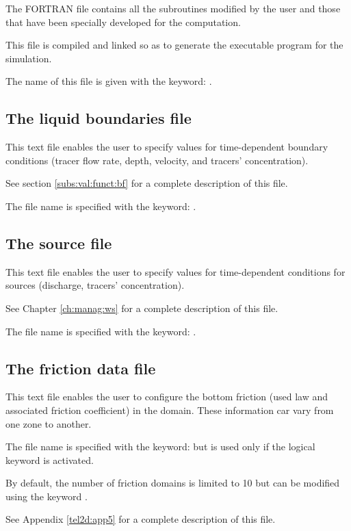  The FORTRAN file contains all the  subroutines modified by the user and those that have been specially developed for the computation.

 This file is compiled and linked so as to generate the executable program for the simulation.

 The name of this file is given with the keyword: .


\subsection{ The liquid boundaries file}

 This text file enables the user to specify values for time-dependent boundary conditions (tracer flow rate, depth, velocity, and tracers' concentration).

 See section \ref{subs:val:funct:bf} for a complete description of this file.

 The file name is specified with the keyword: .


\subsection{  The source file}

 This text file enables the user to specify values for time-dependent conditions for sources (discharge, tracers' concentration).

 See Chapter \ref{ch:manag:ws} for a complete description of this file.

 The file name is specified with the keyword: .


\subsection{ The friction data file}

 This text file enables the user to configure the bottom friction (used law and associated friction coefficient) in the domain. These information car vary from one zone to another.

 The file name is specified with the keyword:  but is used only if the logical keyword  is activated.

 By default, the number of friction domains is limited to 10 but can be modified using the keyword .

 See Appendix \ref{tel2d:app5} for a complete description of this file.


